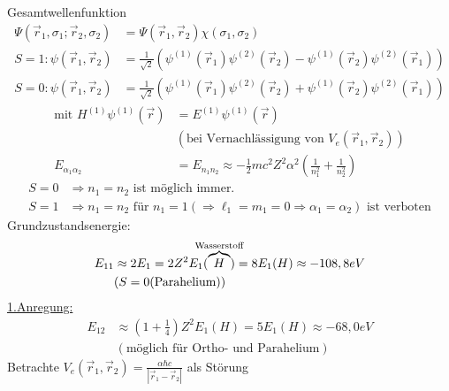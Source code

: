 Gesamtwellenfunktion
	\begin{align*}
		\Psi(\vec{r}_1, \sigma_1 ; \vec{r}_2, \sigma_2) 
		&= \Psi(\vec{r}_1, \vec{r}_2) \chi (\sigma_1, \sigma_2) \\
		S = 1: \psi (\vec{r}_1, \vec{r}_2) &=
		\frac{1}{\sqrt{2}} 
		\left( \psi^{(1)} (\vec{r}_1) \psi^{(2)} (\vec{r}_2) 
		- \psi^{(1)}(\vec{r}_2) \psi^{(2)} (\vec{r}_1) \right) \\
		S = 0: \psi (\vec{r}_1, \vec{r}_2) &=
		\frac{1}{\sqrt{2}} 
		\left( \psi^{(1)} (\vec{r}_1) \psi^{(2)} (\vec{r}_2) 
		+ \psi^{(1)}(\vec{r}_2) \psi^{(2)} (\vec{r}_1) \right)
	\end{align*}
	\begin{align*}
		\text{mit } H^{(1)} \psi^{(1)} (\vec{r}) &= E^{(1)} \psi^{(1)} (\vec{r}) \\
		&\left(\text{bei Vernachlässigung von } V_e (\vec{r}_1, \vec{r}_2) \right) \\
		E_{\alpha_1 \alpha_2} &= E_{n_1 n_2} \approx 
		- \frac{1}{2} m c^2 Z^2 \alpha^2 
		\left( \frac{1}{n_1^2} + \frac{1}{n_2^2} \right)
	\end{align*}	
	\begin{align*}
		S = 0 &\Rightarrow n_1 = n_2 \text{ ist möglich immer.} \\
		S = 1 &\Rightarrow n_1 = n_2 \text{ für } n_1= 1
		(\Rightarrow \ell_1 = m_1 = 0 \Rightarrow \alpha_1 = \alpha_2) 
		\text{ ist verboten}
	\end{align*}
Grundzustandsenergie: 
	\begin{align*}
		E_{11} &\approx 2 E_1 = 2 Z^2 E_1 ( \overbrace{H}^{\mathclap{\text{Wasserstoff}}}) 
		= 8 E_1 (H) \approx -108,8 eV \\
		&( S= 0 (\text{Parahelium})) 
	\end{align*}
\underline{1.Anregung:}
	\begin{align*}
		E_{12} &\approx \left(1 + \frac{1}{4}\right) Z^2 E_1 (H) = 5 E_1(H) \approx -68,0 eV \\
		&(\text{möglich für Ortho- und Parahelium})
	\end{align*}
Betrachte $V_e(\vec{r}_1, \vec{r}_2) = \frac{\alpha \hbar c}{|\vec{r}_1 - \vec{r}_2|}$ als Störung
	
